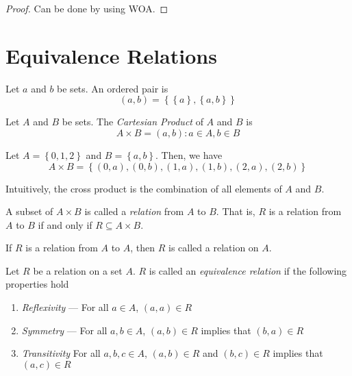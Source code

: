 \begin{proof}
    Can be done by using WOA.
\end{proof}

\section{Equivalence Relations}

\begin{definition}
    Let \(a\) and \(b\) be sets. An ordered pair is
    \[
        (a, b) = \left\{\left\{a\right\}, \left\{a, b\right\}\right\}
    \]
\end{definition}

\begin{definition}
    Let \(A\) and \(B\) be sets. The \textit{Cartesian Product} of \(A\) and \(B\) is
    \[
        A \times B = {(a, b) : a \in A, b \in B}
    \]
\end{definition}

\begin{nexample}
    Let \(A = \left\{0, 1, 2\right\}\) and \(B = \left\{a, b\right\}\). Then, we have
    \[
        A \times B = \left\{(0, a), (0, b), (1, a), (1, b), (2, a), (2, b)\right\}
    \]

    Intuitively, the cross product is the combination of all elements of \(A\) and \(B\).
\end{nexample}

\begin{definition}[Relation]
    A subset of \(A \times B\) is called a \textit{relation} from \(A\) to \(B\). That is, \(R\) is a relation from \(A\) to \(B\) if and only if \(R \subseteq A \times B\).

    If \(R\) is a relation from \(A\) to \(A\), then \(R\) is called a relation on \(A\).
\end{definition}

\begin{definition}
    Let \(R\) be a relation on a set \(A\). \(R\) is called an \textit{equivalence relation} if the following properties hold
    \begin{enumerate}
        \item \textit{Reflexivity} --- For all \(a \in A\), \((a, a) \in R\)
        \item \textit{Symmetry} --- For all \(a, b \in A\), \((a, b) \in R\) implies that \((b, a) \in R\)
        \item \textit{Transitivity} For all \(a, b, c \in A\), \((a, b) \in R\) and \((b, c) \in R\) implies that \((a, c) \in R\)
    \end{enumerate}
\end{definition}

